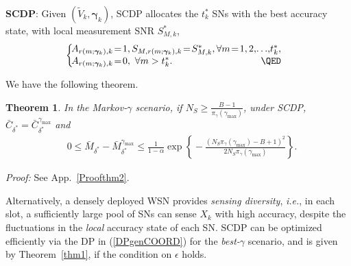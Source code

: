 \documentclass[10pt,twocolumn,twoside]{IEEEtran}
\newtheorem{thm}{Theorem}
\theoremstyle{plain}
\begin{document}
\noindent
\textbf{SCDP}:
Given $(\tilde V_k,\boldsymbol\gamma_k)$, SCDP allocates the $t_k^{*}$  SNs with the best accuracy state,
 with local measurement SNR $S_{M,k}^{*}$,
\begin{align}
\!\!\nonumber \left\{
\begin{array}{l}
\!\!\!\!A_{r(m;\boldsymbol{\gamma}_k),k}\!=\!1,\ \!\!S_{M,r(m;\boldsymbol{\gamma}_k),k}\!=\!S_{M,k}^*,\forall m\!=\!1,2,\!\dots\!,\!t_k^*,
\\
\!\!\!\!A_{r(m;\boldsymbol{\gamma}_k),k}\!=\!0,\ \forall m>t_k^*.\hfill\QED
\end{array}
\right.
\end{align}


We have the following theorem.
\begin{thm}
\label{thm2}
In the \emph{Markov-}$\gamma$ scenario, if $N_S\geq \frac{B-1}{\pi_{\gamma}(\gamma_{\max})}$, 
under SCDP,
$\!\bar C_{\delta^*}\!=\!\bar C_{\delta^*}^{\gamma_{\max}}\!$ and
\begin{align}
&
\!\!\!0\!\leq\!\bar M_{\delta^*}\!\!-\!\bar M_{\delta^*}^{\gamma_{\max}}
\!\!\leq\!
\frac{1}{1\!-\!\alpha}\!\exp\!\left\{\!\!-\frac{\left(N_S\pi_{\gamma}(\gamma_{\max})\!-\!B\!+\!1\right)^2}{2N_S\pi_{\gamma}(\gamma_{\max})}\!\!\right\}\!.\!\!\!
\label{inex}
\end{align}
\end{thm}
\noindent\emph{Proof:}
See App.~\ref{Proofthm2}.
\hfill\QED

Alternatively,
a densely deployed WSN
 provides \emph{sensing diversity}, \emph{i.e.}, in each slot, a sufficiently large pool of SNs
can sense $X_k$ with high accuracy, despite the fluctuations in the \emph{local} accuracy state of each SN.
SCDP can be optimized efficiently via
the DP in (\ref{DPgenCOORD}) for the \emph{best-}$\gamma$ scenario,
and is given by Theorem~\ref{thm1}, if the condition on $\epsilon$ holds.
\vspace{-4mm}
\end{document}
